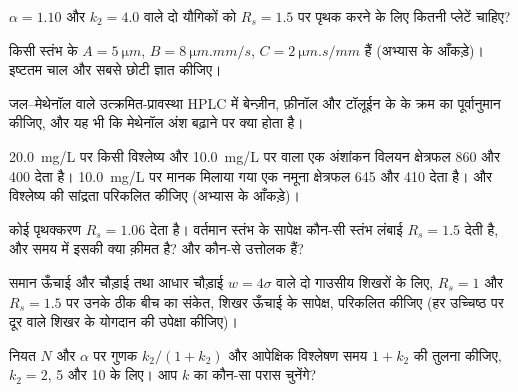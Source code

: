 \begin{exercise}[$\star\star$]\label{exo:b2:chromatography:6}
$\alpha = 1.10$ और $k_2 = 4.0$ वाले दो यौगिकों को
$R_s = 1.5$ पर पृथक करने के लिए कितनी प्लेटें चाहिए?
\end{exercise}

\begin{exercise}[$\star\star$]\label{exo:b2:chromatography:7}
किसी स्तंभ के $A = \qty{5}{\micro m}$, $B = \qty{8}{\micro m.mm/s}$, $C = \qty{2}{\micro m.s/mm}$ हैं
(अभ्यास के आँकड़े)। इष्टतम चाल और सबसे छोटी  ज्ञात कीजिए।
\end{exercise}

\begin{exercise}[$\star\star$]\label{exo:b2:chromatography:8}
जल--मेथेनॉल  वाले उत्क्रमित-प्रावस्था HPLC में बेन्ज़ीन, फ़ीनॉल और टॉलूईन के  के क्रम का
पूर्वानुमान कीजिए, और यह भी कि मेथेनॉल अंश बढ़ाने पर क्या होता है।
\end{exercise}

\begin{exercise}[$\star\star$]\label{exo:b2:chromatography:9}
\qty{20.0}{mg/L} पर किसी विश्लेष्य और \qty{10.0}{mg/L} पर  वाला एक अंशांकन विलयन
क्षेत्रफल 860 और 400 देता है। \qty{10.0}{mg/L} पर मानक मिलाया गया एक नमूना क्षेत्रफल 645 और 410 देता है।
 और विश्लेष्य की सांद्रता परिकलित कीजिए (अभ्यास के आँकड़े)।
\end{exercise}

\begin{exercise}[$\star\star\star$]\label{exo:b2:chromatography:10}
कोई पृथक्करण $R_s = 1.06$ देता है। वर्तमान स्तंभ के सापेक्ष कौन-सी स्तंभ लंबाई $R_s = 1.5$ देती है, और
समय में इसकी क्या क़ीमत है? और कौन-से उत्तोलक हैं?
\end{exercise}

\begin{exercise}[$\star\star\star$]\label{exo:b2:chromatography:11}
समान ऊँचाई और चौड़ाई तथा आधार चौड़ाई $w = 4\sigma$ वाले दो गाउसीय शिखरों के लिए, $R_s = 1$ और $R_s = 1.5$ पर
उनके ठीक बीच का संकेत, शिखर ऊँचाई के सापेक्ष, परिकलित कीजिए (हर उच्चिष्ठ पर दूर वाले
शिखर के योगदान की उपेक्षा कीजिए)।
\end{exercise}

\begin{exercise}[$\star\star\star$]\label{exo:b2:chromatography:12}
नियत $N$ और $\alpha$ पर  गुणक $k_2/(1+k_2)$ और आपेक्षिक विश्लेषण समय
$1 + k_2$ की तुलना कीजिए, $k_2 = 2$, 5 और 10 के लिए। आप $k$ का कौन-सा परास चुनेंगे?
\end{exercise}

